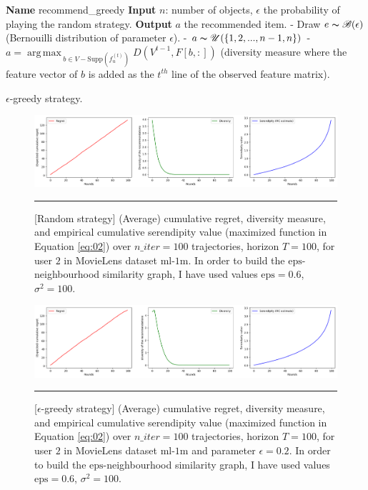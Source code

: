 \documentclass{article}
\DeclareMathOperator*{\argmax}{arg\,max\,}
\begin{document}
\begin{algorithm}
\begin{algorithmic}
\STATE \textbf{Name} recommend\_greedy
\STATE \textbf{Input} $n$: number of objects, $\epsilon$ the probability of playing the random strategy.
\STATE \textbf{Output} $a$ the recommended item.
\STATE - Draw $e \thicksim \mathscr{B}(\epsilon)$ (Bernouilli distribution of parameter $\epsilon$).
\STATE - $a \thicksim \mathscr{U}(\{1, 2, ..., n-1, n\})$
\ELSE
\STATE - $a = \argmax_{b \in V-\text{Supp}(f^{(t)}_{u})} D(V^{t-1}, F[b, :])$ (diversity measure where the feature vector of $b$ is added as the $t^{th}$ line of the observed feature matrix).
\ENDIF
\end{algorithmic}
\caption{$\epsilon$-greedy strategy.}
\label{greedy}
\end{algorithm}

\begin{figure}[H]
  \centering
  \rule[-.5cm]{0cm}{4cm}
  \includegraphics[scale=0.4]{../Results/ml-1m/random-32sec.png}
  \rule[-.5cm]{4cm}{0cm}
  \caption{[Random strategy] (Average) cumulative regret, diversity measure, and empirical cumulative serendipity value (maximized function in Equation \ref{eq:02}) over $n\_iter=100$ trajectories, horizon $T=100$, for user $2$ in MovieLens dataset $\text{ml-1m}$. In order to build the $\text{eps}$-neighbourhood similarity graph, I have used values $\text{eps}=0.6$, $\sigma^{2}=100$.}
\label{figrandom}
\end{figure}

\begin{figure}[H]
  \centering
  \rule[-.5cm]{0cm}{4cm}
  \includegraphics[scale=0.4]{../Results/ml-1m/greedy-1min30sec.png}
  \rule[-.5cm]{4cm}{0cm}
  \caption{[$\epsilon$-greedy strategy] (Average) cumulative regret, diversity measure, and empirical cumulative serendipity value (maximized function in Equation \ref{eq:02}) over $n\_iter=100$ trajectories, horizon $T=100$, for user $2$ in MovieLens dataset $\text{ml-1m}$ and parameter $\epsilon=0.2$. In order to build the $\text{eps}$-neighbourhood similarity graph, I have used values $\text{eps}=0.6$, $\sigma^{2}=100$.}
\label{figgreedy}
\end{figure}
\end{document}
